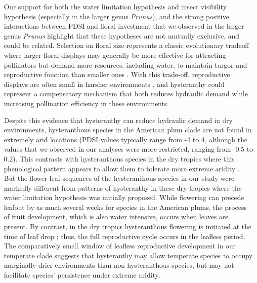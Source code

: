 \documentclass{article}[12pt]
\begin{document}
{{Our support for both the water limitation hypothesis and insect visibility hypothesis (especially in the larger genus \emph{Prunus}), and the strong positive interactions between PDSI and floral investment that we observed in the larger genus \emph{Prunus} highlight that these hypotheses are not mutually exclusive, and could be related. Selection on floral size represents a classic evolutionary tradeoff where larger floral displays may generally be more effective for attracting pollinators but demand more resources, including water, to maintain turgor and reproductive function than smaller ones \citep{Galen:1999vr,Lambrecht:2007ur}. With this trade-off, reproductive displays are often small in harsher environments \citep{Lambrecht:2013aa,Teixido:2016aa}, and hysteranthy could represent a compensatory mechanism that both reduces hydraulic demand while increasing pollination efficiency in these environments. %
 
Despite this evidence that hysteranthy can reduce hydraulic demand in dry environments, hysteranthous species in the American plum clade are not found in extremely arid locations (PDSI values typically range from -4 to 4, although the values that we observed in our analyses were more restricted, ranging from -0.5 to 0.2). This contrasts with hysteranthous species in the dry tropics where this phenological pattern appears to allow them to tolerate more extreme aridity \citep{Franklin2016}. But the flower-leaf sequences of the hysteranthous species in our study were markedly different from patterns of hysteranthy in these dry-tropics where the water limitation hypothesis was initially proposed. While flowering can precede leafout by as much several weeks for species in the American plums, the process of fruit development, which is also water intensive, occurs when leaves are present. By contrast, in the dry tropics hysteranthous flowering is initiated at the time of leaf drop \citep{Borchert1983,Franklin2016}; thus, the full reproductive cycle occurs in the leafless period. The comparatively small window of leafless reproductive development in our temperate clade %
suggests that hysteranthy may allow temperate species to occupy marginally drier environments than non-hysteranthous species, but may not facilitate species' persistence under extreme aridity.  
 
}}
\end{document}
